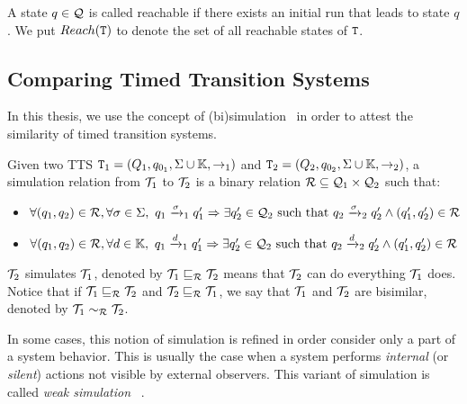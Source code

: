 A state $q\in\mathcal{Q}$ is called reachable if there exists an initial run
that leads to state $q$. We put $Reach(\texttt{T})$ to denote the set of all 
reachable states of $\texttt{T}$.
\subsection{Comparing Timed Transition Systems}
In this thesis, we use the concept of (bi)simulation~\cite{} 
in order to attest the similarity of timed transition systems.
\begin{definition}[Simulation]\label{def:sim}
  Given two TTS $\texttt{T}_{1}=(Q_{1},q_{0_{1}},\Sigma\cup\mathbb{K},\to_{1})$ and $\texttt{T}_{2}=(Q_{2},q_{0_{2}},\Sigma\cup\mathbb{K},\to_{2})$, a simulation relation from 
  $\mathcal{T}_1$ to $\mathcal{T}_2$ is a binary relation $\mathcal{R}\subseteq\mathcal{Q}_1
  \times\mathcal{Q}_2$ such that:
  \begin{itemize}
    \item $\forall(q_1,q_2)\in\mc{R},\forall\sigma\in\Sigma,\ 
      q_1\transitb{\sigma}{1}q_1'\Rightarrow\exists q'_2\in\mc{Q}_2 
      \text{ such that } q_2\transitb{\sigma}{2}q_2'\wedge
      (q_1',q_2')\in\mc{R}$
    \item $\forall(q_1,q_2)\in\mc{R},\forall d\in\mb{K},\ 
      q_1\transitb{d}{1}q_1'\Rightarrow\exists q'_2\in\mc{Q}_2 
      \text{ such that } q_2\transitb{d}{2}q_2'\wedge
      (q_1',q_2')\in\mc{R}$
  \end{itemize}
\end{definition}
  $\mathcal{T}_2$ simulates $\mathcal{T}_1$, denoted by $\mathcal{T}_1\sqsubseteq_{\mathcal{R}}\mathcal{T}_2$
  means that $\mathcal{T}_2$ can do everything $\mathcal{T}_1$ does. Notice that if
  $\mathcal{T}_1\sqsubseteq_{\mathcal{R}}\mathcal{T}_2$ and $\mathcal{T}_2\sqsubseteq_{\mathcal{R}}\mathcal{T}_1$,
  we say that $\mathcal{T}_1$ and $\mathcal{T}_2$ are bisimilar, denoted by
  $\mathcal{T}_1\sim_{\mathcal{R}}\mathcal{T}_2$.  

In some cases, this notion of simulation is refined in order consider only
a part of a system behavior. This is usually the case when a system
performs \emph{internal} (or \emph{silent}) actions not visible by external
observers. This variant of simulation is called \emph{weak simulation}
~\cite{}.

